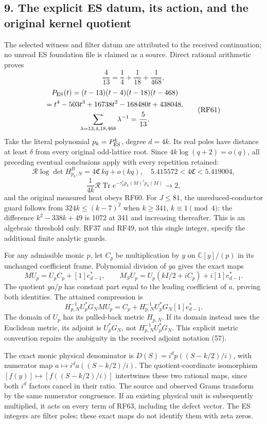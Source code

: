 \documentclass[11pt]{article}
\begin{document}
\subsection{9. The explicit ES datum, its action, and the original kernel quotient}\label{the-explicit-es-datum-its-action-and-the-original-kernel-quotient}

The selected witness and filter datum are attributed to the received continuation; no unread ES foundation file is claimed as a source. Direct rational arithmetic proves \[
\frac4{13}=\frac14+\frac1{18}+\frac1{468},
\] \[
\begin{gathered}
P_{\rm ES}(t)=(t-13)(t-4)(t-18)(t-468)\\
=t^4-503t^3+16738t^2-168480t+438048,\\
\sum_{\lambda=13,4,18,468}\lambda^{-1}=\frac5{13}.
\end{gathered}
\tag{RF61}
\] Take the literal polynomial \(p_k=P_{\rm ES}^k\), degree \(d=4k\). Its real poles have distance at least \(\delta\) from every original odd-lattice root. Since \(4k\log(q+2)=o(q)\), all preceding eventual conclusions apply with every repetition retained: \[
\mathcal R\log\det H^B_{p_k,N}=4\mathfrak C\,kq+o(kq),
\quad 5.415572<4\mathfrak C<5.419004,
\] \[
\frac1{4k}\mathcal R\operatorname{Tr}
e^{-\tau_k^*p_k(M)^\dagger p_k(M)}\longrightarrow2,
\tag{RF62}
\] and the original measured heat obeys RF60. For \(J\le81\), the unreduced-conductor guard follows from \(324k\le(k-7)^2\) when \(k\ge341\), \(k\equiv1\pmod4\): the difference \(k^2-338k+49\) is 1072 at 341 and increasing thereafter. This is an algebraic threshold only. RF37 and RF49, not this single integer, specify the additional finite analytic guards.

For any admissible monic \(p\), let \(C_p\) be multiplication by \(y\) on \(\mathbb C[y]/(p)\) in its unchanged coefficient frame. Polynomial division of \(ya\) gives the exact maps \[
MU_p=U_pC_p+[1]e_{d-1}^*,\qquad
M_SU_p=U_p(kI/2+iC_p)+i[1]e_{d-1}^*.
\tag{RF63}
\] The quotient \(ya/p\) has constant part equal to the leading coefficient of \(a\), proving both identities. The attained compression is \[
H_{p,N}^{-1}U_p^*G_NMU_p
=C_p+H_{p,N}^{-1}U_p^*G_N[1]e_{d-1}^*.
\tag{RF64}
\] The domain of \(U_p\) has its pulled-back metric \(H_{p,N}\). If its domain instead uses the Euclidean metric, its adjoint is \(U_p^*G_N\), not \(H_{p,N}^{-1}U_p^*G_N\). This explicit metric convention repairs the ambiguity in the received adjoint notation (57).

The exact monic physical denominator is \(D(S)=i^dp((S-k/2)/i)\), with numerator map \(a\mapsto i^da((S-k/2)/i)\). The quotient-coordinate isomorphism \([f(y)]\mapsto[f((S-k/2)/i)]\) intertwines these two rational maps, since both \(i^d\) factors cancel in their ratio. The source and observed Grams transform by the same numerator congruence. If an existing physical unit is subsequently multiplied, it acts on every term of RF63, including the defect vector. The ES integers are filter poles; these exact maps do not identify them with zeta zeros.
\end{document}
